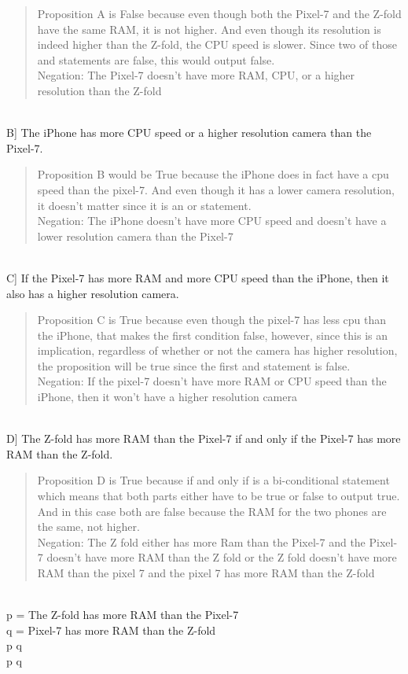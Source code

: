 \documentclass[9pt]{article}
\begin{document}
 \begin{quote}
  Proposition A is False because even though both the Pixel-7 and the Z-fold have the same RAM, it is not higher. And even though its resolution is indeed higher than the Z-fold, the CPU speed is slower. Since two of those and statements are false, this would output false. \\
 Negation: The Pixel-7 doesn't have more RAM, CPU, or a higher resolution than the Z-fold \\
  \end{quote}
\\
B] The iPhone has more CPU speed or a higher resolution camera than the Pixel-7.\\
 \begin{quote}
 Proposition B would be True because the iPhone does in fact have a cpu speed than the pixel-7. And even though it has a lower camera resolution, it doesn't matter since it is an or statement.
 \\
 Negation: The iPhone doesn't have more CPU speed and doesn't have a lower resolution camera than the Pixel-7 \\
   \end{quote}
\\
C] If the Pixel-7 has more RAM and more CPU speed than the iPhone, then it also has
a higher resolution camera.\\
\begin{quote} 
Proposition C is True because even though the pixel-7 has less cpu than the iPhone, that makes the first condition false, however, since this is an implication, regardless of whether or not the camera has higher resolution, the proposition will be true since the first and statement is false. \\
Negation: If the pixel-7 doesn't have more RAM or CPU speed than the iPhone, then it won't have a higher resolution camera \\
  \end{quote}
\\
D] The Z-fold has more RAM than the Pixel-7 if and only if the Pixel-7 has more RAM
than the Z-fold.
\begin{quote}
Proposition D is True because if and only if is a bi-conditional statement which means that both parts either have to be true or false to output true. And in this case both are false because the RAM for the two phones are the same, not higher. \\
Negation: The Z fold either has more Ram than the Pixel-7 and the Pixel-7 doesn't have more RAM than the Z fold or the Z fold doesn't have more RAM than the pixel 7 and the pixel 7 has more RAM than the Z-fold
\\ 
  \end{quote}
\\
p = The Z-fold has more RAM than the Pixel-7 \\
q = Pixel-7 has more RAM than the Z-fold
\\
p \lor \lnot q \\
\lnot p \lor q \\
\\
\end{document}

